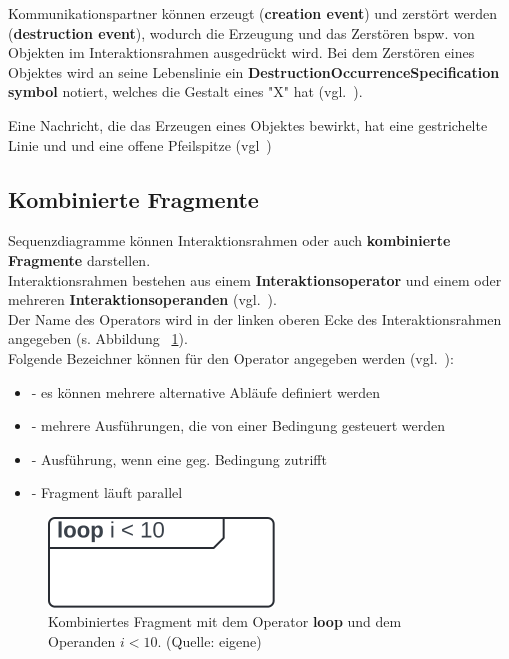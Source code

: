 \noindent
Kommunikationspartner können erzeugt (\textbf{creation event}) und zerstört werden (\textbf{destruction event}), wodurch die Erzeugung und das Zerstören bspw. von Objekten im Interaktionsrahmen ausgedrückt wird.
Bei dem Zerstören eines Objektes wird an seine Lebenslinie ein \textbf{DestructionOccurrenceSpecification symbol} notiert, welches die Gestalt eines "X" hat (vgl.~\cite[578]{OMG17}).

\begin{tcolorbox}[title=creation event, colback=white]
    Eine Nachricht, die das Erzeugen eines Objektes bewirkt, hat eine gestrichelte Linie und und eine offene Pfeilspitze (vgl~\cite[577]{OMG17})
\end{tcolorbox}

\subsection{Kombinierte Fragmente}
Sequenzdiagramme können Interaktionsrahmen oder auch \textbf{kombinierte Fragmente} darstellen.\\
Interaktionsrahmen bestehen aus einem \textbf{Interaktionsoperator} und einem oder mehreren \textbf{Interaktionsoperanden} (vgl.~\cite[582]{OMG17}).\\
Der Name des Operators wird in der linken oberen Ecke des Interaktionsrahmen angegeben (s. Abbildung ~\ref{fig:interaktionsoperand}).\\
Folgende Bezeichner können für den Operator angegeben werden (vgl.~\cite[583]{OMG17}):

\begin{itemize}
    \item {} - es können mehrere alternative Abläufe definiert werden
    \item {} - mehrere Ausführungen, die von einer Bedingung gesteuert werden
    \item {} - Ausführung, wenn eine geg. Bedingung zutrifft
    \item {} - Fragment läuft parallel
\end{itemize}

\begin{figure}
    \centering
    \includegraphics[scale=0.5]{part three/Sequenzdiagramme/img/interaktionsoperand}
    \caption{Kombiniertes Fragment mit dem Operator \textbf{loop} und dem Operanden $i < 10$. (Quelle: eigene)}
    \label{fig:interaktionsoperand}
\end{figure}

